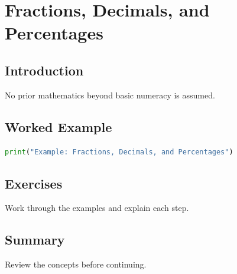 \chapter{Fractions, Decimals, and Percentages}
\label{chap:vol4-2}



\section{Introduction}
No prior mathematics beyond basic numeracy is assumed.

\section{Worked Example}
\begin{lstlisting}[language=Python]
print("Example: Fractions, Decimals, and Percentages")
\end{lstlisting}

\section{Exercises}
\begin{exercise}
Work through the examples and explain each step.
\end{exercise}

\section{Summary}
Review the concepts before continuing.
